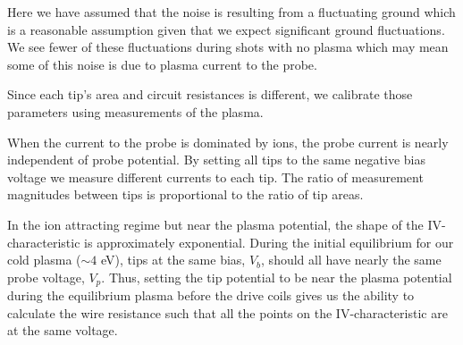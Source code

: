 
Here we have assumed that the noise is resulting from a fluctuating ground which is a reasonable assumption given that we expect significant ground fluctuations. We see fewer of these fluctuations during shots with no plasma which may mean some of this noise is due to plasma current to the probe. %


Since each tip's area and circuit resistances is different, we calibrate those parameters using measurements of the plasma.


When the current to the probe is dominated by ions, the probe current is nearly independent of probe potential. By setting all tips to the same negative bias voltage we measure different currents to each tip. The ratio of measurement magnitudes between tips is proportional to the ratio of tip areas.


In the ion attracting regime but near the plasma potential, the shape of the IV-characteristic is approximately exponential. During the initial equilibrium for our cold plasma ($\sim4$ eV), tips at the same bias, $V_b$, should all have nearly the same probe voltage, $V_p$. Thus, setting the tip potential to be near the plasma potential during the equilibrium plasma before the drive coils gives us the ability to calculate the wire resistance such that all the points on the IV-characteristic are at the same voltage.

